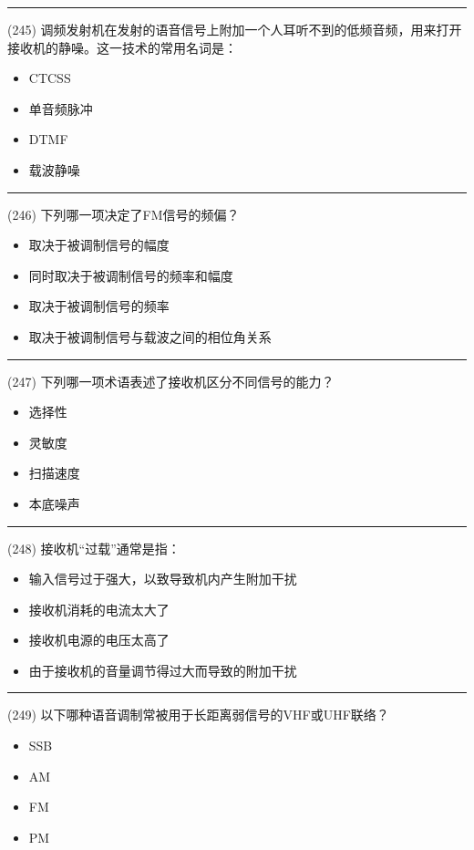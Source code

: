 \documentclass[twocolumn]{ctexart}  %
\begin{document}
\noindent\rule{0.5\textwidth}{1pt}
\heiti (245) 调频发射机在发射的语音信号上附加一个人耳听不到的低频音频，用来打开接收机的静噪。这一技术的常用名词是： \songti {\color{gray} [LK1099] }
\begin{itemize}
	\item  CTCSS
	\item  单音频脉冲
	\item  DTMF
	\item  载波静噪
\end{itemize}


\noindent\rule{0.5\textwidth}{1pt}
\heiti (246) 下列哪一项决定了FM信号的频偏？ \songti {\color{gray} [LK1100] }
\begin{itemize}
	\item  取决于被调制信号的幅度
	\item  同时取决于被调制信号的频率和幅度
	\item  取决于被调制信号的频率
	\item  取决于被调制信号与载波之间的相位角关系
\end{itemize}


\noindent\rule{0.5\textwidth}{1pt}
\heiti (247) 下列哪一项术语表述了接收机区分不同信号的能力？ \songti {\color{gray} [LK1177] }
\begin{itemize}
	\item  选择性
	\item  灵敏度
	\item  扫描速度
	\item  本底噪声
\end{itemize}


\noindent\rule{0.5\textwidth}{1pt}
\heiti (248) 接收机“过载”通常是指： \songti {\color{gray} [LK1180] }
\begin{itemize}
	\item  输入信号过于强大，以致导致机内产生附加干扰
	\item  接收机消耗的电流太大了
	\item  接收机电源的电压太高了
	\item  由于接收机的音量调节得过大而导致的附加干扰
\end{itemize}


\noindent\rule{0.5\textwidth}{1pt}
\heiti (249) 以下哪种语音调制常被用于长距离弱信号的VHF或UHF联络？ \songti {\color{gray} [LK1202] }
\begin{itemize}
	\item  SSB
	\item  AM
	\item  FM
	\item  PM
\end{itemize}
\end{document}
